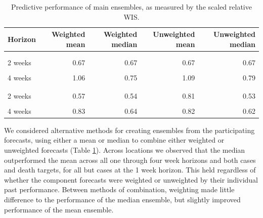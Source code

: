 \documentclass[
]{article}
\begin{document}
\begin{table}

\caption{\label{tab:ensembles}Predictive performance of main ensembles, as measured by the scaled relative WIS.}
\centering
\begin{tabular}[t]{lrrrr}
\toprule
Horizon & Weighted mean & Weighted median & Unweighted mean & Unweighted median\\
\midrule
\addlinespace[0.3em]
\multicolumn{5}{l}{\textbf{Cases}}\\
\hspace{1em}\cellcolor{gray!6}{1 week} & \cellcolor{gray!6}{0.59} & \cellcolor{gray!6}{0.62} & \cellcolor{gray!6}{0.59} & \cellcolor{gray!6}{0.61}\\
\hspace{1em}2 weeks & 0.67 & 0.67 & 0.67 & 0.67\\
\hspace{1em}\cellcolor{gray!6}{3 weeks} & \cellcolor{gray!6}{0.79} & \cellcolor{gray!6}{0.70} & \cellcolor{gray!6}{0.81} & \cellcolor{gray!6}{0.71}\\
\hspace{1em}4 weeks & 1.06 & 0.75 & 1.09 & 0.79\\
\addlinespace[0.3em]
\multicolumn{5}{l}{\textbf{Deaths}}\\
\hspace{1em}\cellcolor{gray!6}{1 week} & \cellcolor{gray!6}{0.63} & \cellcolor{gray!6}{0.59} & \cellcolor{gray!6}{1.00} & \cellcolor{gray!6}{0.59}\\
\hspace{1em}2 weeks & 0.57 & 0.54 & 0.81 & 0.53\\
\hspace{1em}\cellcolor{gray!6}{3 weeks} & \cellcolor{gray!6}{0.64} & \cellcolor{gray!6}{0.56} & \cellcolor{gray!6}{0.83} & \cellcolor{gray!6}{0.54}\\
\hspace{1em}4 weeks & 0.83 & 0.64 & 0.82 & 0.62\\
\bottomrule
\end{tabular}
\end{table}

We considered alternative methods for creating ensembles from the participating forecasts, using either a mean or median to combine either weighted or unweighted forecasts (Table \ref{tab:ensembles}). Across locations we observed that the median outperformed the mean across all one through four week horizons and both cases and death targets, for all but cases at the 1 week horizon. This held regardless of whether the component forecasts were weighted or unweighted by their individual past performance. Between methods of combination, weighting made little difference to the performance of the median ensemble, but slightly improved performance of the mean ensemble.
\end{document}
